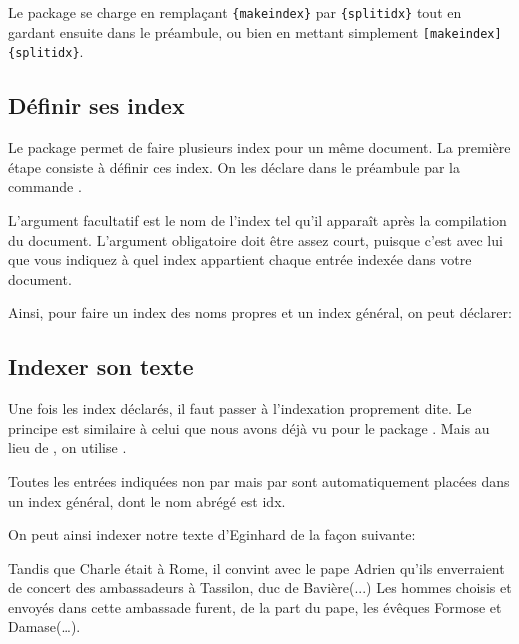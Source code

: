 \begin{bashcode}
Le package se charge en remplaçant \verb|{makeindex}| par \verb|{splitidx}| tout en gardant ensuite  dans le préambule, ou bien en mettant simplement  \verb|[makeindex]{splitidx}|.

\subsection{Définir ses index}

Le package  permet de faire plusieurs index pour un même document. La première étape consiste à définir ces index. On les déclare dans le préambule par la commande .


L'argument facultatif est le nom de l'index tel qu'il apparaît après la compilation du document. L'argument obligatoire doit être assez court, puisque c'est avec lui que vous indiquez à quel index appartient chaque entrée indexée dans votre document.


Ainsi, pour faire un index des noms propres et un index général, on peut déclarer:
\begin{latexcode}
\end{latexcode}

\subsection{Indexer son texte}
Une fois  les index déclarés, il faut passer à l'indexation proprement dite. Le principe est similaire à celui que nous avons déjà vu pour le package .
Mais au lieu de , on utilise . 

\begin{plusloins}

Toutes les entrées indiquées non par  mais par  sont automatiquement placées dans un index général, dont le nom abrégé est idx.

\end{plusloins}
On peut ainsi indexer notre texte d'Eginhard de la façon suivante:

\begin{latexcode}

Tandis que Charle était à Rome, il convint
avec le pape Adrien qu’ils enverraient de concert
des ambassadeurs à Tassilon, duc de Bavière(...)
Les hommes choisis et envoyés dans cette ambassade furent, de 
la part du pape, les évêques Formose et 
Damase(…).


\end{latexcode}
\end{bashcode}
